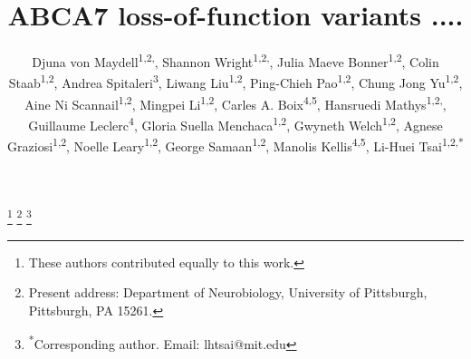 \title{ABCA7 loss-of-function variants .... }

\author{%
  \parbox{\textwidth}{%
    Djuna von Maydell\textsuperscript{1,2,\textdagger}, 
    Shannon Wright\textsuperscript{1,2,\textdagger}, 
    Julia Maeve Bonner\textsuperscript{1,2}, 
    Colin Staab\textsuperscript{1,2}, 
    Andrea Spitaleri\textsuperscript{3}, 
    Liwang Liu\textsuperscript{1,2}, 
    Ping-Chieh Pao\textsuperscript{1,2}, 
    Chung Jong Yu\textsuperscript{1,2}, 
    Aine Ni Scannail\textsuperscript{1,2}, 
    Mingpei Li\textsuperscript{1,2}, 
    Carles A. Boix\textsuperscript{4,5}, 
    Hansruedi Mathys\textsuperscript{1,2,\textdaggerdbl}, 
    Guillaume Leclerc\textsuperscript{4}, 
    Gloria Suella Menchaca\textsuperscript{1,2}, 
    Gwyneth Welch\textsuperscript{1,2}, 
    Agnese Graziosi\textsuperscript{1,2}, 
    Noelle Leary\textsuperscript{1,2}, 
    George Samaan\textsuperscript{1,2}, 
    Manolis Kellis\textsuperscript{4,5}, 
    Li-Huei Tsai\textsuperscript{1,2,*}
  }%
}

\date{}
\maketitle


\thanks{\textsuperscript{\textdagger}These authors contributed equally to this work.}
\thanks{\textsuperscript{\textdaggerdbl}Present address: Department of Neurobiology, University of Pittsburgh, Pittsburgh, PA 15261.}
\thanks{\textsuperscript{*}Corresponding author. Email: lhtsai@mit.edu}

